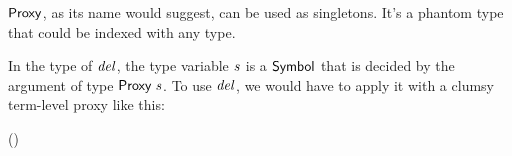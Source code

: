 \ensuremath{\Conid{Proxy}}, as its name would suggest, can be used as
 singletons. It's a phantom type that could be indexed with any type.

\begin{hscode}\SaveRestoreHook
{}%
%
\>[B]{}\;\;\mathrel{=}\<[E]%
\ColumnHook
\end{hscode}\resethooks

In the type of \ensuremath{\Varid{del}}, the type variable
 \ensuremath{\Varid{s}} is a \ensuremath{\Conid{Symbol}} that is decided by
 the argument of type \ensuremath{\Conid{Proxy}\;\Varid{s}}.
 To use \ensuremath{\Varid{del}}, we would have to apply it with a clumsy
 term-level proxy like this:

\begin{hscode}\SaveRestoreHook
{}%
%
\>[B]{}\;(\mathbin{::}\;){}\<[E]%
\ColumnHook
\end{hscode}\resethooks
